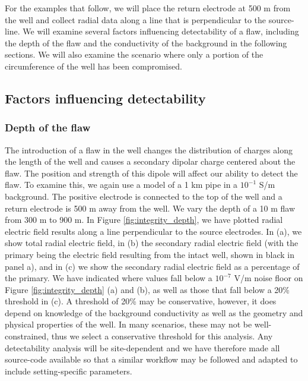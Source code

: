 \documentclass[extra,mreferee]{gji}
\begin{document}
For the examples that follow, we will place the return electrode at 500 m from the well and collect radial data along a line that is perpendicular to the source-line. We will examine several factors influencing detectability of a flaw, including the depth of the flaw and the conductivity of the background in the following sections. We will also examine the scenario where only a portion of the circumference of the well has been compromised.




\subsection{Factors influencing detectability}
\subsubsection{Depth of the flaw}

The introduction of a flaw in the well changes the distribution of charges along the length of the well and causes a secondary dipolar charge centered about the flaw. The position and strength of this dipole will affect our ability to detect the flaw. To examine this, we again use a model of a 1 km pipe in a $10^{-1}$ S/m background. The positive electrode is connected to the top of the well and a return electrode is 500 m away from the well. We vary the depth of a 10 m flaw from 300 m to 900 m. In Figure \ref{fig:integrity_depth}, we have plotted radial electric field results along a line perpendicular to the source electrodes. In (a), we show total radial electric field, in (b) the secondary radial electric field (with the primary being the electric field resulting from the intact well, shown in black in panel a), and in (c) we show the secondary radial electric field as a percentage of the primary. We have indicated where values fall below a $10^{-7}$ V/m noise floor on Figure \ref{fig:integrity_depth} (a) and (b), as well as those that fall below a 20\% threshold in (c). A threshold of 20\% may be conservative, however, it does depend on knowledge of the background conductivity as well as the geometry and physical properties of the well. In many scenarios, these may not be well-constrained, thus we select a conservative threshold for this analysis. Any detectability analysis will be site-dependent and we have therefore made all source-code available so that a similar workflow may be followed and adapted to include setting-specific parameters.
\end{document}
